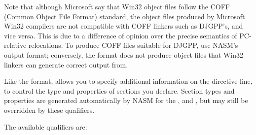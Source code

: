 Note that although Microsoft say that Win32 object files follow the
COFF (Common Object File Format) standard, the object files produced
by Microsoft Win32 compilers are not compatible with COFF linkers such
as DJGPP's, and vice versa. This is due to a difference of opinion over
the precise semantics of PC-relative relocations. To produce COFF files
suitable for DJGPP, use NASM's  output format; conversely,
the  format does not produce object files that Win32 linkers
can generate correct output from.


Like the  format,  allows you to specify additional
information on the  directive line, to control the type
and properties of sections you declare. Section types and properties
are generated automatically by NASM for the 
,  and , but may still be overridden by
these qualifiers.

The available qualifiers are:


